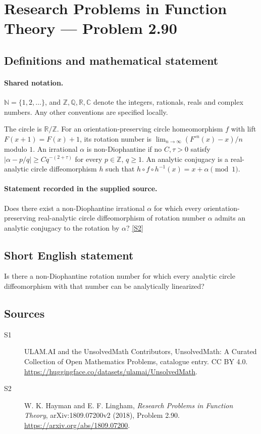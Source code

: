 \documentclass[11pt]{article}
\newcommand{\sref}[2]{\hyperlink{source:#1:#2}{[S#2]}}
\begin{document}
\section{Research Problems in Function Theory — Problem 2.90}\label{statement}

\subsection{Definitions and mathematical statement}

\paragraph{Shared notation.}$\mathbb N=\{1,2,\ldots\}$, and $\mathbb Z,\mathbb Q,\mathbb R,\mathbb C$ denote the integers, rationals, reals and complex numbers. Any other conventions are specified locally.


The circle is $\mathbb R/\mathbb Z$. For an orientation-preserving circle homeomorphism $f$ with lift $F(x+1)=F(x)+1$, its rotation number is $\lim_{n\to\infty}(F^{\circ n}(x)-x)/n$ modulo $1$. An irrational $\alpha$ is non-Diophantine if no $C,\tau>0$ satisfy $|\alpha-p/q|\geq Cq^{-(2+\tau)}$ for every $p\in\mathbb Z$, $q\geq1$. An analytic conjugacy is a real-analytic circle diffeomorphism $h$ such that $h\circ f\circ h^{-1}(x)=x+\alpha\pmod1$.
\paragraph{Statement recorded in the supplied source.}
Does there exist a non-Diophantine irrational $\alpha$ for which every orientation-preserving real-analytic circle diffeomorphism of rotation number $\alpha$ admits an analytic conjugacy to the rotation by $\alpha$? \sref{statement}{2}
\subsection{Short English statement}
Is there a non-Diophantine rotation number for which every analytic circle diffeomorphism with that number can be analytically linearized?
\subsection{Sources}
\begin{description}
\item[\hypertarget{source:statement:1}{S1}] ULAM.AI and the UnsolvedMath Contributors, UnsolvedMath: A Curated Collection of Open Mathematics Problems, catalogue entry. CC BY 4.0. \url{https://huggingface.co/datasets/ulamai/UnsolvedMath}.
\item[\hypertarget{source:statement:2}{S2}] W. K. Hayman and E. F. Lingham, \emph{Research Problems in Function Theory}, arXiv:1809.07200v2 (2018), Problem 2.90. \url{https://arxiv.org/abs/1809.07200}.
\end{description}
\label{end:statement}
\end{document}

